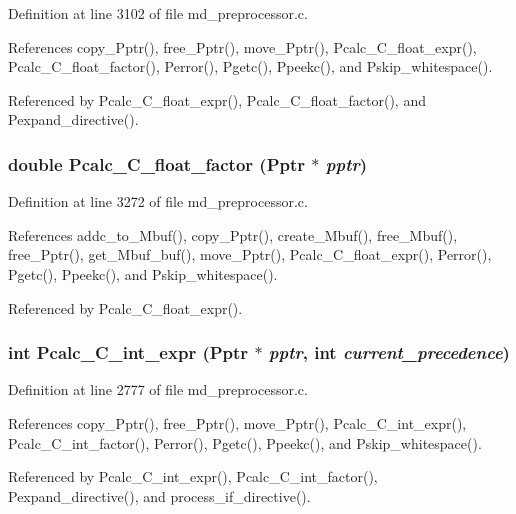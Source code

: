 Definition at line 3102 of file md\_\-preprocessor.c.

References copy\_\-Pptr(), free\_\-Pptr(), move\_\-Pptr(), Pcalc\_\-C\_\-float\_\-expr(), Pcalc\_\-C\_\-float\_\-factor(), Perror(), Pgetc(), Ppeekc(), and Pskip\_\-whitespace().

Referenced by Pcalc\_\-C\_\-float\_\-expr(), Pcalc\_\-C\_\-float\_\-factor(), and Pexpand\_\-directive().
\subsubsection{\setlength{\rightskip}{0pt plus 5cm}double Pcalc\_\-C\_\-float\_\-factor (\bf{Pptr} $\ast$ {\em pptr})}\label{md__preprocessor_8h_d5d57d0445efaf105fc993c973500e88}




Definition at line 3272 of file md\_\-preprocessor.c.

References addc\_\-to\_\-Mbuf(), copy\_\-Pptr(), create\_\-Mbuf(), free\_\-Mbuf(), free\_\-Pptr(), get\_\-Mbuf\_\-buf(), move\_\-Pptr(), Pcalc\_\-C\_\-float\_\-expr(), Perror(), Pgetc(), Ppeekc(), and Pskip\_\-whitespace().

Referenced by Pcalc\_\-C\_\-float\_\-expr().
\subsubsection{\setlength{\rightskip}{0pt plus 5cm}int Pcalc\_\-C\_\-int\_\-expr (\bf{Pptr} $\ast$ {\em pptr}, int {\em current\_\-precedence})}\label{md__preprocessor_8h_d0cd379c806bdf45c36a3f8fe9f28201}




Definition at line 2777 of file md\_\-preprocessor.c.

References copy\_\-Pptr(), free\_\-Pptr(), move\_\-Pptr(), Pcalc\_\-C\_\-int\_\-expr(), Pcalc\_\-C\_\-int\_\-factor(), Perror(), Pgetc(), Ppeekc(), and Pskip\_\-whitespace().

Referenced by Pcalc\_\-C\_\-int\_\-expr(), Pcalc\_\-C\_\-int\_\-factor(), Pexpand\_\-directive(), and process\_\-if\_\-directive().

